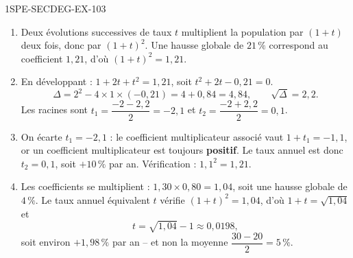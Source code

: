 \begin{corrige}{1SPE-SECDEG-EX-103}
\begin{enumerate}
\item Deux évolutions successives de taux $t$ multiplient la population par
  $(1+t)$ deux fois, donc par $(1+t)^2$. Une hausse globale de $21\,\%$
  correspond au coefficient $1{,}21$, d'où $(1+t)^2 = 1{,}21$.

\item En développant : $1 + 2t + t^2 = 1{,}21$, soit
  $t^2 + 2t - 0{,}21 = 0$.
  \[
    \Delta = 2^2 - 4\times1\times(-0{,}21) = 4 + 0{,}84 = 4{,}84,
    \qquad \sqrt{\Delta} = 2{,}2 .
  \]
  Les racines sont
  $t_1 = \dfrac{-2 - 2{,}2}{2} = -2{,}1$ et
  $t_2 = \dfrac{-2 + 2{,}2}{2} = 0{,}1$.

\item On écarte $t_1 = -2{,}1$ : le coefficient multiplicateur associé vaut
  $1 + t_1 = -1{,}1$, or un coefficient multiplicateur est toujours
  \textbf{positif}. Le taux annuel est donc $t_2 = 0{,}1$, soit $+10\,\%$
  par an. Vérification : $1{,}1^2 = 1{,}21$. \checkmark

\item Les coefficients se multiplient :
  $1{,}30 \times 0{,}80 = 1{,}04$, soit une hausse globale de $4\,\%$.
  Le taux annuel équivalent $t$ vérifie $(1+t)^2 = 1{,}04$, d'où
  $1 + t = \sqrt{1{,}04}$ et
  \[
    t = \sqrt{1{,}04} - 1 \approx 0{,}0198,
  \]
  soit environ $+1{,}98\,\%$ par an -- et non la moyenne
  $\dfrac{30 - 20}{2} = 5\,\%$.
\end{enumerate}
\end{corrige}
